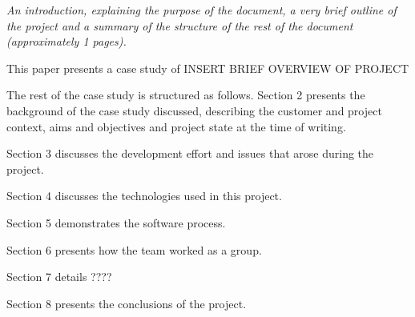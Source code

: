 \documentclass[../dissertation.tex]{subfiles}
\begin{document}
\textit{An introduction, explaining the purpose of the document, a very brief outline of the project and a summary of the structure of the rest of the document (approximately 1 pages).}

This paper presents a case study of INSERT BRIEF OVERVIEW OF PROJECT

The rest of the case study is structured as follows.  Section 2 presents the background of the case study discussed, describing the customer and project context, aims and
objectives and project state at the time of writing.

Section 3 discusses the development effort and issues that arose during the project.

Section 4 discusses the technologies used in this project.

Section 5 demonstrates the software process.

Section 6 presents how the team worked as a group.

Section 7 details ????

Section 8 presents the conclusions of the project.
\end{document}
